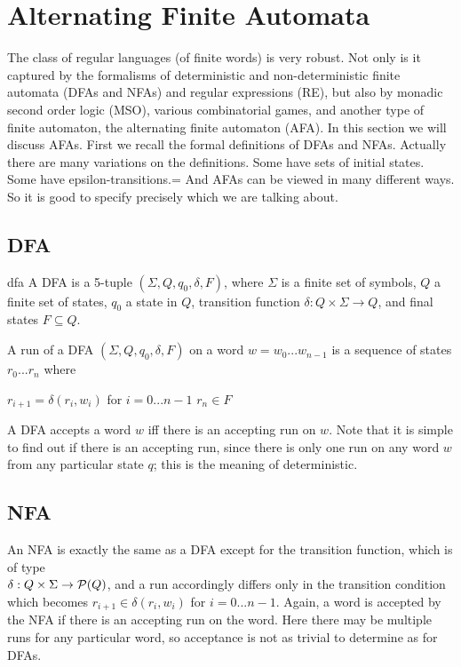 
\section {Alternating Finite Automata}

The class of regular languages (of finite words) is very robust.
Not only is it captured by the formalisms of deterministic and non-deterministic
finite automata (DFAs and NFAs) and regular expressions (RE),
but also by monadic second order logic (MSO),
various combinatorial games, and another type of finite automaton,
the alternating finite automaton (AFA).
In this section we will discuss AFAs.
First we recall the formal definitions of DFAs and NFAs.
Actually there are many variations on the definitions.
Some have sets of initial states. Some have epsilon-transitions.=
And AFAs can be viewed in many different ways.
So it is good to specify precisely which we are talking about.

\break

\subsection{DFA}

\begin{defnL}{dfa}
    A DFA is a 5-tuple $(\Sigma, Q, q_0, \delta, F)$, where $\Sigma$ is a finite set of symbols, $Q$ a finite set of states, $q_0$ a state in $Q$, transition function $\delta: Q \times \Sigma \to Q$, and final states $F \subseteq Q$.
\end{defnL}

A run of a DFA $(\Sigma, Q, q_0, \delta, F)$ on a word $w=w_0...w_{n-1}$ is a sequence of states $r_0...r_n$ where

       { $r_{i+1} = \delta(r_i, w_i)$ for $i=0...n-1$}
       {$r_n \in F$}

A DFA accepts a word $w$ iff there is an accepting run on $w$. Note that it is simple to find out if there is an accepting run, since there is only one run on any word $w$ from any particular state $q$; this is the meaning of deterministic.

\subsection{NFA}
An NFA is exactly the same as a DFA except for the transition function, which is of type \\ $\delta: Q \times \Sigma \to \mathcal{P}(Q)$, and a run accordingly differs only in the transition condition which becomes $r_{i+1} \in \delta(r_i, w_i)$ for $i=0...n-1$. Again, a word is accepted by the NFA if there is an accepting run on the word. Here there may be multiple runs for any particular word, so acceptance is not as trivial to determine as for DFAs.

